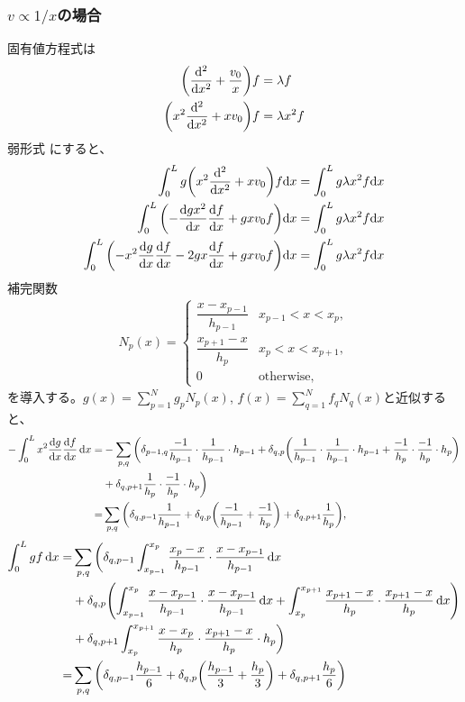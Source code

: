 \documentclass[xelatex,ja=standard]{bxjsarticle}
\begin{document}
\subsubsection{$v\propto1/x$の場合}
固有値方程式は
\begin{align}
    \qty(\dv[2]{x} + \frac{v_0}{x})f &= \lambda f\notag\\
    \qty(x^2\dv[2]{x} + xv_0)f &= \lambda x^2 f
\end{align}
弱形式
にすると、
\begin{align}
    \int_0^L g\qty(x^2\dv[2]{x} + xv_0)f\dd x &= \int_0^L g\lambda x^2 f\dd x\notag\\
    \int_0^L\qty( -\dv{g x^2}{x}\dv{f}{x} + gxv_0f)\dd x &= \int_0^L g\lambda x^2 f\dd x\notag\\
    \int_0^L\qty( - x^2\dv{g}{x}\dv{f}{x} - 2gx\dv{f}{x} + gxv_0f)\dd x &= \int_0^L g\lambda x^2 f\dd x
\end{align}
補完関数
\begin{align}
    N_p(x) = 
    \begin{cases}
        \dfrac{x-x_{p-1}}{h_{p-1}}&x_{p-1}<x<x_p,\\
        \dfrac{x_{p+1} - x}{h_p}&x_{p}<x<x_{p+1},\\
        0&\text{otherwise},
    \end{cases}
\end{align}
を導入する。$g(x) = \sum_{p=1}^N g_pN_p(x)$, $f(x) = \sum_{q=1}^N f_qN_q(x)$と近似すると、
\begin{align}
    -\int_0^L x^2\dv{g}{x}\dv{f}{x}\dd{x}
     =& -\sum_{p, q}\bigg(\delta_{p - 1, q}\dfrac{-1}{h_{p-1}}\cdot\dfrac{1}{h_{p-1}}\cdot h_{p-1}
      + \delta_{q, p}\qty(\dfrac{1}{h_{p-1}}\cdot\dfrac{1}{h_{p-1}}\cdot h_{p-1} + \dfrac{-1}{h_{p}}\cdot\dfrac{-1}{h_{p}}\cdot h_{p})\notag\\
      &+ \delta_{q, p + 1}\dfrac{1}{h_{p}}\cdot\dfrac{-1}{h_{p}}\cdot h_{p}
      \bigg)\notag\\
     =& \sum_{p, q}\bigg(\delta_{q, p - 1}\dfrac{1}{h_{p-1}}
      + \delta_{q, p}\qty(\dfrac{-1}{h_{p-1}} + \dfrac{-1}{h_{p}})+ \delta_{q, p + 1}\dfrac{1}{h_{p}}
      \bigg),
\end{align}
\begin{align}
    \int_0^L gf\dd{x}
     =& \sum_{p, q}\bigg(\delta_{q, p - 1}\int_{x_{p-1}}^{x_p}\dfrac{x_{p} - x}{h_{p-1}}\cdot\dfrac{x-x_{p-1}}{h_{p-1}}\dd{x}\notag\\
      &+ \delta_{q, p}\qty(\int_{x_{p-1}}^{x_p}\dfrac{x-x_{p-1}}{h_{p-1}}\cdot\dfrac{x-x_{p-1}}{h_{p-1}}\dd{x}
       + \int_{x_{p}}^{x_{p+1}}\dfrac{x_{p+1} - x}{h_{p}}\cdot\dfrac{x_{p+1} - x}{h_{p}}\dd{x})\notag\\
      &+ \delta_{q, p + 1}\int_{x_{p}}^{x_{p+1}}\dfrac{x-x_{p}}{h_{p}}\cdot\dfrac{x_{p+1} -x}{h_{p}}\cdot h_{p}
      \bigg)\notag\\
      =& \sum_{p, q}\bigg(\delta_{q, p - 1}\dfrac{h_{p-1}}{6}
      + \delta_{q, p}\qty(\dfrac{h_{p-1}}{3} + \dfrac{h_{p}}{3})+ \delta_{q, p + 1}\dfrac{h_{p}}{6}\bigg)
\end{align}
\end{document}
